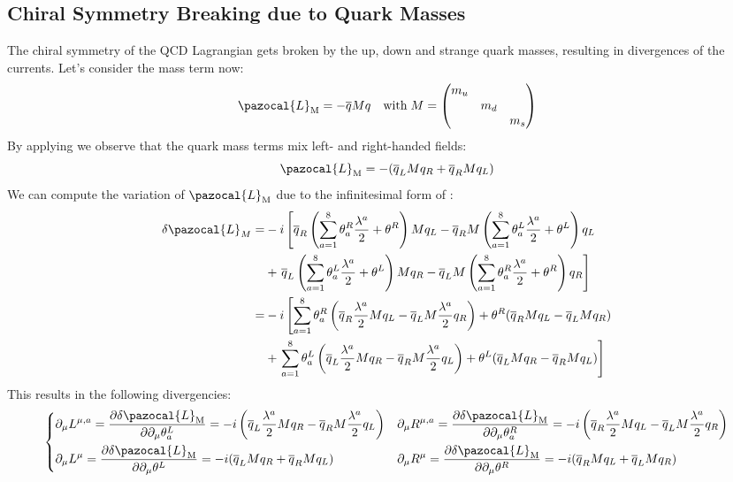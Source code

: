\documentclass[../main.tex]{subfiles}
\begin{document}
\subsection{Chiral Symmetry Breaking due to Quark Masses}
The chiral symmetry of the QCD Lagrangian gets broken by the up, down and strange quark masses, resulting in divergences of the currents. Let's consider the mass term now:
\[
\pazocal{L}_{\text{M}}=-\overline{q}Mq \quad \text{with}\;M=\mqty(\dmat{m_u,m_d,m_s})
\]
By applying  we observe that the quark mass terms mix left- and right-handed fields:
\[
\pazocal{L}_{\text{M}}=-(\overline{q}_LMq_R+\overline{q}_RMq_L)
\]
We can compute the variation of $\pazocal{L}_{\text{M}}$ due to the infinitesimal form of :
\begin{align*}
\delta\pazocal{L}_M=&-i\left[\overline{q}_R\left(\sum_{a=1}^8\theta_a^R\frac{\lambda^a}{2}+\theta^R\right)Mq_L-\overline{q}_RM\left(\sum_{a=1}^8\theta_a^L\frac{\lambda^a}{2}+\theta^L\right)q_L\right.\\
&+\left.\overline{q}_L\left(\sum_{a=1}^8\theta_a^L\frac{\lambda^a}{2}+\theta^L\right)Mq_R-\overline{q}_LM\left(\sum_{a=1}^8\theta_a^R\frac{\lambda^a}{2}+\theta^R\right)q_R\right]\\
=&-i\left[\sum_{a=1}^8\theta_a^R\left(\overline{q}_R\frac{\lambda^a}{2}Mq_L-\overline{q}_LM\frac{\lambda^a}{2}q_R\right)+\theta^R(\overline{q}_RMq_L-\overline{q}_LMq_R)\right.\\
&+\left.\sum_{a=1}^8\theta_a^L\left(\overline{q}_L\frac{\lambda^a}{2}Mq_R-\overline{q}_RM\frac{\lambda^a}{2}q_L\right)+\theta^L(\overline{q}_LMq_R-\overline{q}_RMq_L)\right]
\end{align*}
This results in the following divergencies:
\[
\left\{
\begin{aligned}
&\partial_\mu L^{\mu,a}=\frac{\partial\delta\pazocal{L}_{\text{M}}}{\partial\partial_\mu\theta_a^L}=-i\left(\overline{q}_L\frac{\lambda^a}{2}Mq_R-\overline{q}_RM\frac{\lambda^a}{2}q_L\right) &&\partial_\mu R^{\mu,a}=\frac{\partial\delta\pazocal{L}_{\text{M}}}{\partial\partial_\mu\theta_a^R}=-i\left(\overline{q}_R\frac{\lambda^a}{2}Mq_L-\overline{q}_LM\frac{\lambda^a}{2}q_R\right)\\
&\partial_\mu L^\mu=\frac{\partial\delta\pazocal{L}_{\text{M}}}{\partial\partial_\mu\theta^L}=-i(\overline{q}_LMq_R+\overline{q}_RMq_L) &&\partial_\mu R^\mu=\frac{\partial\delta\pazocal{L}_{\text{M}}}{\partial\partial_\mu\theta^R}=-i(\overline{q}_RMq_L+\overline{q}_LMq_R)
\end{aligned}
\right.
\]
\end{document}

